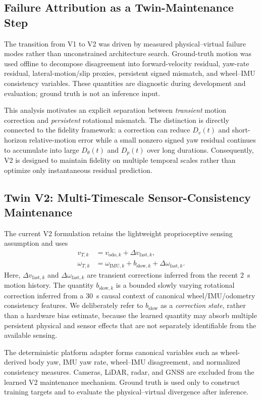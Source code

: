 \documentclass[conference]{IEEEtran}
\newcommand{\Dp}{D_{p}}
\newcommand{\Dtheta}{D_{\theta}}
\newcommand{\Dv}{D_{v}}
\begin{document}
\subsection{Failure Attribution as a Twin-Maintenance Step}
The transition from V1 to V2 was driven by measured physical--virtual failure modes rather than unconstrained architecture search. Ground-truth motion was used offline to decompose disagreement into forward-velocity residual, yaw-rate residual, lateral-motion/slip proxies, persistent signed mismatch, and wheel--IMU consistency variables. These quantities are diagnostic during development and evaluation; ground truth is not an inference input.

This analysis motivates an explicit separation between \emph{transient} motion correction and \emph{persistent} rotational mismatch. The distinction is directly connected to the fidelity framework: a correction can reduce $\Dv(t)$ and short-horizon relative-motion error while a small nonzero signed yaw residual continues to accumulate into large $\Dtheta(t)$ and $\Dp(t)$ over long durations. Consequently, V2 is designed to maintain fidelity on multiple temporal scales rather than optimize only instantaneous residual prediction.

\subsection{Twin V2: Multi-Timescale Sensor-Consistency Maintenance}
The current V2 formulation retains the lightweight proprioceptive sensing assumption and uses
\begin{align}
v_{T,k} &= v_{\mathrm{odo},k}+\Delta v_{\mathrm{fast},k},\\
\omega_{T,k} &= \omega_{\mathrm{IMU},k}
+b_{\mathrm{slow},k}+\Delta\omega_{\mathrm{fast},k}.
\label{eq:v2_motion}
\end{align}
Here, $\Delta v_{\mathrm{fast},k}$ and $\Delta\omega_{\mathrm{fast},k}$ are transient corrections inferred from the recent 2~s motion history. The quantity $b_{\mathrm{slow},k}$ is a bounded slowly varying rotational correction inferred from a 30~s causal context of canonical wheel/IMU/odometry consistency features. We deliberately refer to $b_{\mathrm{slow}}$ as a \emph{correction state}, rather than a hardware bias estimate, because the learned quantity may absorb multiple persistent physical and sensor effects that are not separately identifiable from the available sensing.

The deterministic platform adapter forms canonical variables such as wheel-derived body yaw, IMU yaw rate, wheel--IMU disagreement, and normalized consistency measures. Cameras, LiDAR, radar, and GNSS are excluded from the learned V2 maintenance mechanism. Ground truth is used only to construct training targets and to evaluate the physical--virtual divergence after inference.
\end{document}
